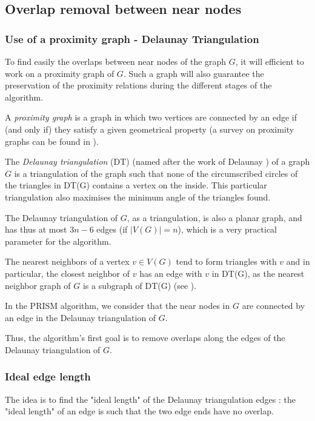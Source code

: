 \documentclass[12pt]{report}
\begin{document}
\subsection{Overlap removal between near nodes}

\subsubsection{Use of a proximity graph - Delaunay Triangulation}

To find easily the overlaps between near nodes of the graph $G$, it will efficient to work on a proximity graph of $G$. Such a graph will also guarantee the preservation of the proximity relations during the different stages of the algorithm.

A \emph{proximity graph} is a graph in which two vertices are connected by an edge if (and only if) they satisfy a given geometrical property (a survey on proximity graphs can be found in \cite{JT92}).

\bigskip

The \emph{Delaunay triangulation} (DT) (named after the work of Delaunay \cite{Delaunay34}) of a graph $G$ is a triangulation of the graph such that none of the circumscribed circles of the triangles in DT(G) contains a vertex on the inside. This particular triangulation also maximises the minimum angle of the triangles found.

The Delaunay triangulation of $G$, as a triangulation, is also a planar graph, and has thus at most $3n -6$ edges (if $|V(G)| = n$), which is a very practical parameter for the algorithm.

\bigskip

The nearest neighbors of a vertex $v \in V(G)$ tend to form triangles with $v$ and in particular, the closest neighbor of $v$ has an edge with $v$ in DT(G), as the nearest neighbor graph of $G$ is a subgraph of DT(G) (see \cite{JT92}).

In the PRISM algorithm, we consider that the near nodes in $G$ are connected by an edge in the Delaunay triangulation of $G$.

Thus, the algorithm's first goal is to remove overlaps along the edges of the Delaunay triangulation of $G$.

\subsubsection{Ideal edge length}
The idea is to find the "ideal length" of the Delaunay triangulation edges : the "ideal length" of an edge is such that the two edge ends have no overlap.
\end{document}
